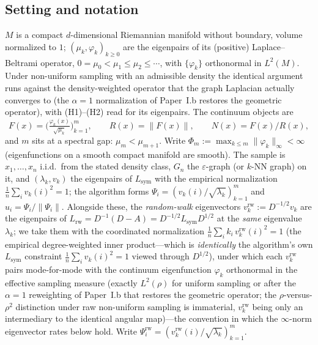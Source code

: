 \documentclass[11pt]{article}
\theoremstyle{remark}
\begin{document}
\subsection*{Setting and notation}
$M$ is a compact $d$-dimensional Riemannian manifold without boundary, volume
normalized to $1$; $(\mu_k,\varphi_k)_{k\ge0}$ are the eigenpairs of its
(positive) Laplace--Beltrami operator, $0=\mu_0<\mu_1\le\mu_2\le\cdots$, with
$\{\varphi_k\}$ orthonormal in $L^2(M)$. Under non-uniform sampling with an
admissible density the identical argument runs against the density-weighted
operator that the graph Laplacian actually converges to
\cite{garciatrillos2018,calder2022} (the $\alpha{=}1$ normalization of
Paper~I.b restores the geometric operator), with (H1)--(H2) read for
its eigenpairs. The continuum objects are
\[
F(x)=\Big(\tfrac{\varphi_k(x)}{\sqrt{\mu_k}}\Big)_{k=1}^{m},\qquad
R(x)=\lVert F(x)\rVert,\qquad N(x)=F(x)/R(x),
\]
and $m$ sits at a spectral gap: $\mu_m<\mu_{m+1}$. Write
$\Phi_m:=\max_{k\le m}\lVert\varphi_k\rVert_\infty<\infty$ (eigenfunctions on a
smooth compact manifold are smooth). The sample is $x_1,\dots,x_n$ i.i.d.\ from
the stated density class, $G_n$ the $\varepsilon$-graph (or $k$-NN graph) on it,
and $(\lambda_k,v_k)$ the eigenpairs of $L_{\mathrm{sym}}$ with the empirical
normalization $\tfrac1n\sum_i v_k(i)^2=1$; the algorithm forms
$\Psi_i=(v_k(i)/\sqrt{\lambda_k})_{k=1}^m$ and
$\hat u_i=\Psi_i/\lVert\Psi_i\rVert$. Alongside these, the \emph{random-walk}
eigenvectors $v^{\mathrm{rw}}_k:=D^{-1/2}v_k$ are the eigenpairs of
$L_{\mathrm{rw}}=D^{-1}(D-A)=D^{-1/2}L_{\mathrm{sym}}D^{1/2}$ at the \emph{same}
eigenvalue $\lambda_k$; we take them with the coordinated normalization
$\tfrac1n\sum_i k_i\,v^{\mathrm{rw}}_k(i)^2=1$ (the empirical degree-weighted inner
product---which is \emph{identically} the algorithm's own $L_{\mathrm{sym}}$
constraint $\tfrac1n\sum_i v_k(i)^2=1$ viewed through $D^{1/2}$), under which each
$v^{\mathrm{rw}}_k$ pairs mode-for-mode with the continuum eigenfunction
$\varphi_k$ orthonormal in the effective sampling measure (exactly $L^2(\rho)$ for
uniform sampling or after the $\alpha{=}1$ reweighting of Paper~I.b that
restores the geometric operator; the $\rho$-versus-$\rho^2$ distinction under raw
non-uniform sampling is immaterial, $v^{\mathrm{rw}}_k$ being only an intermediary
to the identical angular map)---the convention in which the $\infty$-norm
eigenvector rates below hold. Write
$\Psi^{\mathrm{rw}}_i=(v^{\mathrm{rw}}_k(i)/\sqrt{\lambda_k})_{k=1}^m$.
\end{document}
